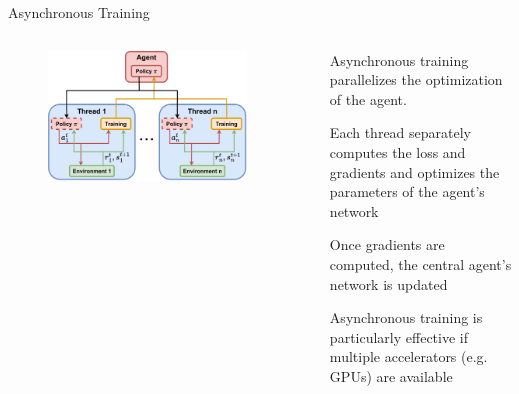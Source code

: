 \begin{frame}{Asynchronous Training}
\vspace{2pt}
\begin{columns}
    \begin{column}{0.5\textwidth}
    \begin{figure}
        \centering
        \includegraphics[width=0.9\textwidth]{images/chapter_8/asynchronous_training.pdf}
        \label{fig:enter-label}
    \end{figure}
    \end{column}
    \begin{column}{0.5\textwidth}
        \blist
            \item Asynchronous training parallelizes the optimization of the agent.
            \item Each thread separately computes the loss and gradients and optimizes the parameters of the agent's network 
            \item Once gradients are computed, the central agent's network is updated
            \item Asynchronous training is particularly effective if multiple accelerators (e.g. GPUs) are available
        \elist
    \end{column}
\end{columns}
\end{frame}

